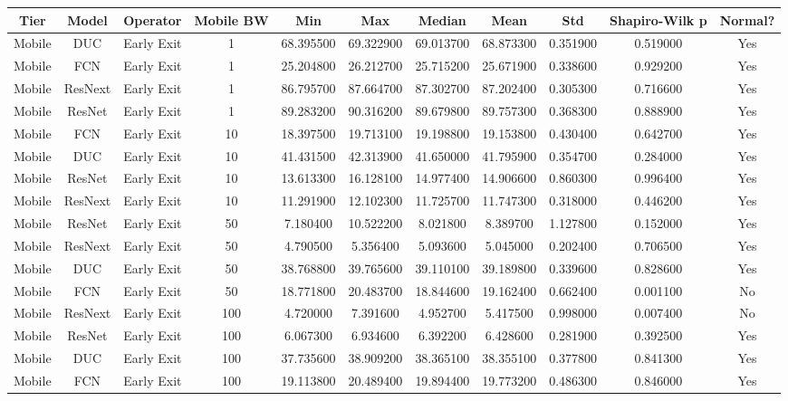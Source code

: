 \begin{tabular}{|c||c||c||c||c||c||c||c||c||c||c|}
\toprule
Tier & Model & Operator & Mobile BW & Min & Max & Median & Mean & Std & Shapiro-Wilk p & Normal? \\
\midrule
Mobile & DUC & Early Exit & 1 & 68.395500 & 69.322900 & 69.013700 & 68.873300 & 0.351900 & 0.519000 & Yes \\
Mobile & FCN & Early Exit & 1 & 25.204800 & 26.212700 & 25.715200 & 25.671900 & 0.338600 & 0.929200 & Yes \\
Mobile & ResNext & Early Exit & 1 & 86.795700 & 87.664700 & 87.302700 & 87.202400 & 0.305300 & 0.716600 & Yes \\
Mobile & ResNet & Early Exit & 1 & 89.283200 & 90.316200 & 89.679800 & 89.757300 & 0.368300 & 0.888900 & Yes \\
Mobile & FCN & Early Exit & 10 & 18.397500 & 19.713100 & 19.198800 & 19.153800 & 0.430400 & 0.642700 & Yes \\
Mobile & DUC & Early Exit & 10 & 41.431500 & 42.313900 & 41.650000 & 41.795900 & 0.354700 & 0.284000 & Yes \\
Mobile & ResNet & Early Exit & 10 & 13.613300 & 16.128100 & 14.977400 & 14.906600 & 0.860300 & 0.996400 & Yes \\
Mobile & ResNext & Early Exit & 10 & 11.291900 & 12.102300 & 11.725700 & 11.747300 & 0.318000 & 0.446200 & Yes \\
Mobile & ResNet & Early Exit & 50 & 7.180400 & 10.522200 & 8.021800 & 8.389700 & 1.127800 & 0.152000 & Yes \\
Mobile & ResNext & Early Exit & 50 & 4.790500 & 5.356400 & 5.093600 & 5.045000 & 0.202400 & 0.706500 & Yes \\
Mobile & DUC & Early Exit & 50 & 38.768800 & 39.765600 & 39.110100 & 39.189800 & 0.339600 & 0.828600 & Yes \\
Mobile & FCN & Early Exit & 50 & 18.771800 & 20.483700 & 18.844600 & 19.162400 & 0.662400 & 0.001100 & No \\
Mobile & ResNext & Early Exit & 100 & 4.720000 & 7.391600 & 4.952700 & 5.417500 & 0.998000 & 0.007400 & No \\
Mobile & ResNet & Early Exit & 100 & 6.067300 & 6.934600 & 6.392200 & 6.428600 & 0.281900 & 0.392500 & Yes \\
Mobile & DUC & Early Exit & 100 & 37.735600 & 38.909200 & 38.365100 & 38.355100 & 0.377800 & 0.841300 & Yes \\
Mobile & FCN & Early Exit & 100 & 19.113800 & 20.489400 & 19.894400 & 19.773200 & 0.486300 & 0.846000 & Yes \\

\end{tabular}
